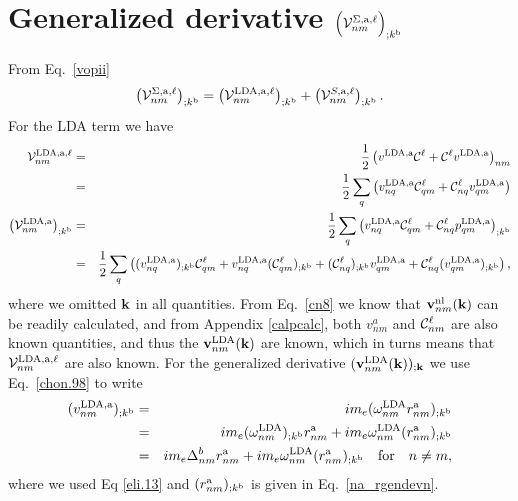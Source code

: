 \section{Generalized derivative \texorpdfstring{$\Big({\cal V}^{\Sigma,\mathrm{a},\ell}_{nm}\Big)_{;k^{\mathrm{b}}}$}{(Vnm);kb}}\label{calvs} 
From Eq.~\eqref{vopii}
\begin{eqnarray}\label{a.1}
\left(
{\mathbf{\cal V}}^{\Sigma,\mathrm{a},\ell}_{nm}
\right)_{;k^{\mathrm{b}}}
=
\left(
{\mathbf{\cal V}}^{\mathrm{LDA},\mathrm{a},\ell}_{nm}
\right)_{;k^{\mathrm{b}}}
+
\left(
{\mathbf{\cal V}}^{S,\mathrm{a},\ell}_{nm}
\right)_{;k^{\mathrm{b}}}
.
\end{eqnarray} 
For the LDA term we have
\begin{eqnarray}\label{a.2}
{\mathbf{\cal V}}^{\mathrm{LDA},\mathrm{a},\ell}_{nm}
&=&
\frac{1}{2}\left(  
v^{\mathrm{LDA},\mathrm{a}}{\mathbf{\cal C}}^\ell+{\mathbf{\cal C}}^\ell v^{\mathrm{LDA},\mathrm{a}}
\right)_{nm}
\nonumber\\
&=&
\frac{1}{2}\sum_q\left(  
v^{\mathrm{LDA},\mathrm{a}}_{nq}{\mathbf{\cal C}}^\ell_{qm}+{\mathbf{\cal C}}^\ell_{nq} v^{\mathrm{LDA},\mathrm{a}}_{qm}
\right)
\nonumber\\
\left({\mathbf{\cal V}}^{\mathrm{LDA},\mathrm{a}}_{nm}\right)_{;k^{\mathrm{b}}}
&=&
\frac{1}{2}\sum_q\left(  
v^{\mathrm{LDA},\mathrm{a}}_{nq}{\mathbf{\cal C}}^\ell_{qm}+{\mathbf{\cal C}}^\ell_{nq} p^{\mathrm{LDA},\mathrm{a}}_{qm}
\right) _{;k^{\mathrm{b}}}
\nonumber\\
&=&
\frac{1}{2}\sum_q\left(
(v^{\mathrm{LDA},\mathrm{a}}_{nq})_{;k^{\mathrm{b}}}{\mathbf{\cal C}}^\ell_{qm}
+   
v^{\mathrm{LDA},\mathrm{a}}_{nq}({\mathbf{\cal C}}^\ell_{qm})_{;k^{\mathrm{b}}}
+
({\mathbf{\cal C}}^\ell_{nq})_{;k^{\mathrm{b}}} v^{\mathrm{LDA},\mathrm{a}}_{qm}
+
{\mathbf{\cal C}}^\ell_{nq} (v^{\mathrm{LDA},\mathrm{a}}_{qm})_{;k^{\mathrm{b}}}
\right)
,
\end{eqnarray}   
where we omitted $\mathbf{k}$ in all quantities.
From Eq.~\eqref{cn8} we know that $\mathbf{v}^{\mathrm{nl}}_{nm}(\mathbf{k})$
 can be readily
calculated,
and from Appendix \ref{calpcalc}, both $v^a_{nm}$ and
${\mathbf{\cal C}}_{nm}^\ell$ are also known quantities, 
 and thus the
$\mathbf{v}^{\mathrm{LDA}}_{nm}(\mathbf{k})$ are known, which in turns means that 
${\mathbf{\cal V}}^{\mathrm{LDA},\mathrm{a},\ell}_{nm}$ are also known.
For the generalized derivative 
$(\mathbf{v}^{\mathrm{LDA}}_{nm}(\mathbf{k}))_{;\mathbf{k}}$ we use Eq.~\eqref{chon.98}
to write
\begin{eqnarray}\label{a.3}
(v^{\mathrm{LDA},\mathrm{a}}_{nm})_{;k^{\mathrm{b}}}
&=&  
im_e(\omega^{\mathrm{LDA}}_{nm}r^{\mathrm{a}}_{nm})_{;k^{\mathrm{b}}}
\nonumber\\
&=&  
im_e(\omega^{\mathrm{LDA}}_{nm})_{;k^{\mathrm{b}}} r^{\mathrm{a}}_{nm}
+  
im_e\omega^{\mathrm{LDA}}_{nm}(r^{\mathrm{a}}_{nm})_{;k^{\mathrm{b}}}
\nonumber\\
&=&  
im_e\Delta^b_{nm}r^{\mathrm{a}}_{nm}
+ 
im_e\omega^{\mathrm{LDA}}_{nm}(r^{\mathrm{a}}_{nm})_{;k^{\mathrm{b}}}
\quad\mathrm{for}\quad n\ne m
,
\end{eqnarray} 
where we used Eq \eqref{eli.13} and $(r^{\mathrm{a}}_{nm})_{;k^{\mathrm{b}}}$ is given
in Eq.~\eqref{na_rgendevn}.


